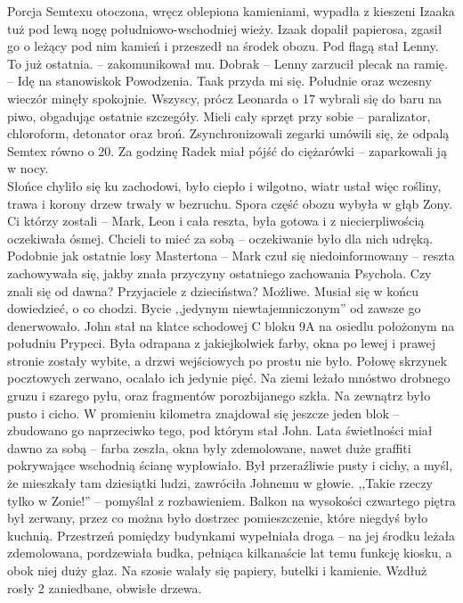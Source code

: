 \documentclass[../MAIN.tex]{subfiles}
\begin{document}
Porcja Semtexu otoczona, wręcz oblepiona kamieniami, wypadła z kieszeni Izaaka tuż pod lewą nogę południowo-wschodniej wieży. Izaak dopalił papierosa, zgasił go o leżący pod nim kamień i przeszedł na środek obozu. Pod flagą stał Lenny.
\sx To już ostatnia. -- zakomunikował mu.
\xx Dobra\3k -- Lenny zarzucił plecak na ramię. -- Idę na stanowisko\3k
\xx Powodzenia.
\xx Taa\3k przyda mi się.
\qd
Południe oraz wczesny wieczór minęły spokojnie. Wszyscy, prócz Leonarda o 17 wybrali się do baru na piwo, obgadując ostatnie szczegóły. Mieli cały sprzęt przy sobie -- paralizator, chloroform, detonator oraz broń. Zsynchronizowali zegarki umówili się, że odpalą Semtex równo o 20. Za godzinę Radek miał pójść do ciężarówki -- zaparkowali ją w nocy.\\
Słońce chyliło się ku zachodowi, było ciepło i wilgotno, wiatr ustał więc rośliny, trawa i korony drzew trwały w bezruchu. Spora część obozu wybyła w głąb Zony. Ci którzy zostali -- Mark, Leon i cała reszta, była gotowa i z niecierpliwością oczekiwała ósmej. Chcieli to mieć za sobą -- oczekiwanie było dla nich udręką. Podobnie jak ostatnie losy Mastertona -- Mark czuł się niedoinformowany -- reszta zachowywała się, jakby znała przyczyny ostatniego zachowania Psychola. Czy znali się od dawna? Przyjaciele z dzieciństwa? Możliwe. Musiał się w końcu dowiedzieć, o co chodzi. Bycie ,,jedynym niewtajemniczonym'' od zawsze go denerwowało.
%
%
John stał na klatce schodowej C bloku 9A na osiedlu położonym na południu Prypeci. Była odrapana z jakiejkolwiek farby, okna po lewej i prawej stronie zostały wybite, a drzwi wejściowych po prostu nie było. Połowę skrzynek pocztowych zerwano, ocalało ich jedynie pięć. Na ziemi leżało mnóstwo drobnego gruzu i szarego pyłu, oraz fragmentów porozbijanego szkła. Na zewnątrz było pusto i cicho. W promieniu kilometra znajdował się jeszcze jeden blok -- zbudowano go naprzeciwko tego, pod którym stał John. Lata świetlności miał dawno za sobą -- farba zeszła, okna były zdemolowane, nawet duże graffiti pokrywające wschodnią ścianę wypłowiało. Był przeraźliwie pusty i cichy, a myśl, że mieszkały tam dziesiątki ludzi, zawróciła Johnemu w głowie. ,,Takie rzeczy tylko w Zonie!'' -- pomyślał z rozbawieniem.
Balkon na wysokości czwartego piętra był zerwany, przez co można było dostrzec pomieszczenie, które niegdyś było kuchnią. Przestrzeń pomiędzy budynkami wypełniała droga -- na jej środku leżała zdemolowana, pordzewiała budka, pełniąca kilkanaście lat temu funkcję kiosku, a obok niej duży głaz. Na szosie walały się papiery, butelki i kamienie. Wzdłuż rosły 2 zaniedbane, obwisłe drzewa.\\
\end{document}

